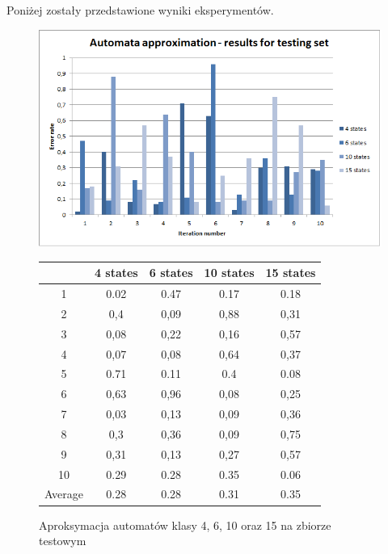 \documentclass[runningheads,a4paper]{llncs}
\begin{document}
Poniżej zostały przedstawione wyniki eksperymentów. \\

\begin{figure}[!htb]
\includegraphics[scale=1]{1.png}
\endminipage\hfill
{}
\renewcommand{\arraystretch}{1.5}%
\begin{tabular}{@{}ccccc@{}}
\toprule
        & 4 states & 6 states & 10 states & 15 states \\ \midrule
1       & 0.02     & 0.47     & 0.17      & 0.18      \\
2       & 0,4      & 0,09     & 0,88      & 0,31      \\
3       & 0,08     & 0,22     & 0,16      & 0,57      \\
4       & 0,07     & 0,08     & 0,64      & 0,37      \\
5       & 0.71     & 0.11     & 0.4       & 0.08      \\
6       & 0,63     & 0,96     & 0,08      & 0,25        \\
7       & 0,03     & 0,13     & 0,09      & 0,36        \\
8       & 0,3      & 0,36     & 0,09      & 0,75         \\
9       & 0,31     & 0,13     & 0,27      & 0,57     \\
10      & 0.29     & 0.28     & 0.35      & 0.06      \\ \bottomrule
Average & 0.28    & 0.28    & 0.31     & 0.35      \\ \bottomrule
\end{tabular}
\vspace{4mm}
\endminipage\hfill
\caption{Aproksymacja automatów klasy 4, 6, 10 oraz 15 na zbiorze testowym}
\end{figure}
\end{document}
